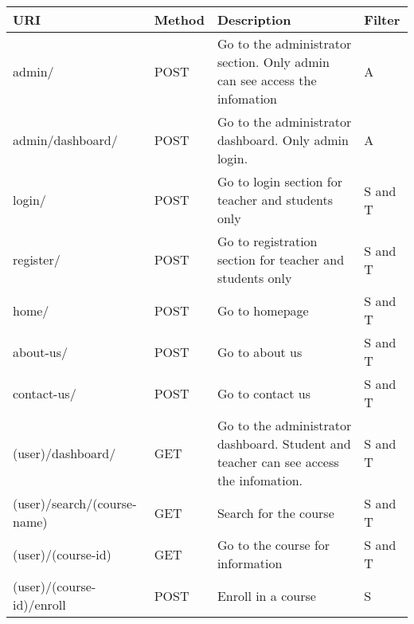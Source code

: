 \begin{longtable}{|p{}|p{} |p{}|p{}|} 

\hline
\textbf{URI} & \textbf{Method} & \textbf{Description} & \textbf{Filter} \\

\hline
admin/   
&   %
POST
&   %
Go to the administrator section. Only admin can see access the infomation
&   %
A\\
\hline

\hline
admin/dashboard/
&   %
POST
&   %
Go to the administrator dashboard. Only admin login.
&   %
A\\
\hline

\hline
login/   
&   %
POST
&   %
Go to login section for teacher and students only
&   %
S and T\\
\hline

\hline
register/   
&   %
POST
&   %
Go to registration section for teacher and students only
&   %
S and T\\
\hline

\hline
home/   
&   %
POST
&   %
Go to homepage
&   %
S and T\\
\hline

\hline
about-us/   
&   %
POST
&   %
Go to about us
&   %
S and T\\
\hline

\hline
contact-us/   
&   %
POST
&   %
Go to contact us
&   %
S and T\\
\hline

\hline
(user)/dashboard/
&   %
GET
&   %
Go to the administrator dashboard. Student and teacher can see access the infomation.
&   %
S and T\\
\hline

\hline
(user)/search/(course-name)
&   %
GET
&   %
Search for the course
&   %
S and T\\
\hline

\hline
(user)/(course-id) 
&   %
GET
&   %
Go to the course for information
&   %
S and T\\
\hline

\hline
(user)/(course-id)/enroll
&   %
POST
&   %
Enroll in a course
&   %
S\\
\hline


\end{longtable}
